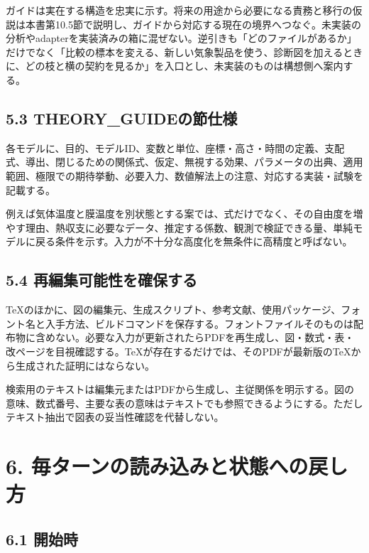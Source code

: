 \documentclass[11pt,a4paper]{article}
\begin{document}
ガイドは実在する構造を忠実に示す。将来の用途から必要になる責務と移行の仮説は本書第10.5節で説明し、ガイドから対応する現在の境界へつなぐ。未実装の分析やadapterを実装済みの箱に混ぜない。逆引きも「どのファイルがあるか」だけでなく「比較の標本を変える、新しい気象製品を使う、診断図を加えるときに、どの枝と横の契約を見るか」を入口とし、未実装のものは構想側へ案内する。

\subsection{5.3
THEORY\_GUIDEの節仕様}\label{theory_guideux306eux7bc0ux4ed5ux69d8}

各モデルに、目的、モデルID、変数と単位、座標・高さ・時間の定義、支配式、導出、閉じるための関係式、仮定、無視する効果、パラメータの出典、適用範囲、極限での期待挙動、必要入力、数値解法上の注意、対応する実装・試験を記載する。

例えば気体温度と膜温度を別状態とする案では、式だけでなく、その自由度を増やす理由、熱収支に必要なデータ、推定する係数、観測で検証できる量、単純モデルに戻る条件を示す。入力が不十分な高度化を無条件に高精度と呼ばない。

\subsection{5.4
再編集可能性を確保する}\label{ux518dux7de8ux96c6ux53efux80fdux6027ux3092ux78baux4fddux3059ux308b}

TeXのほかに、図の編集元、生成スクリプト、参考文献、使用パッケージ、フォント名と入手方法、ビルドコマンドを保存する。フォントファイルそのものは配布物に含めない。必要な入力が更新されたらPDFを再生成し、図・数式・表・改ページを目視確認する。TeXが存在するだけでは、そのPDFが最新版のTeXから生成された証明にはならない。

検索用のテキストは編集元またはPDFから生成し、主従関係を明示する。図の意味、数式番号、主要な表の意味はテキストでも参照できるようにする。ただしテキスト抽出で図表の妥当性確認を代替しない。

\section{6.
毎ターンの読み込みと状態への戻し方}\label{ux6bceux30bfux30fcux30f3ux306eux8aadux307fux8fbcux307fux3068ux72b6ux614bux3078ux306eux623bux3057ux65b9}

\subsection{6.1 開始時}\label{ux958bux59cbux6642}
\end{document}
